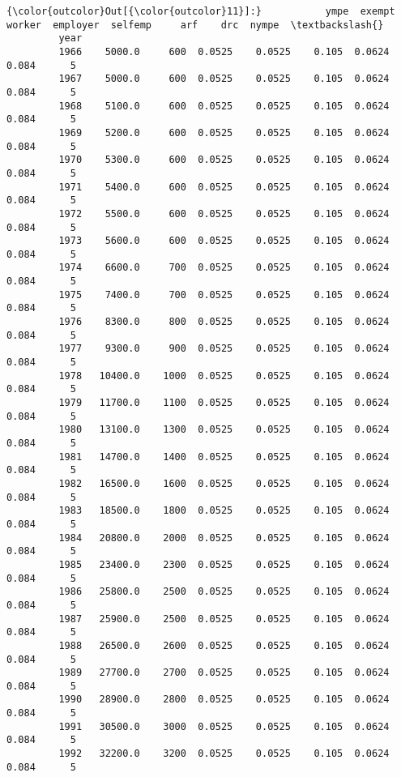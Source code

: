 \documentclass[11pt]{article}
\begin{document}
\begin{Verbatim}[commandchars=\\\{\}]
{\color{outcolor}Out[{\color{outcolor}11}]:}           ympe  exempt  worker  employer  selfemp     arf    drc  nympe  \textbackslash{}
         year                                                                      
         1966    5000.0     600  0.0525    0.0525    0.105  0.0624  0.084      5   
         1967    5000.0     600  0.0525    0.0525    0.105  0.0624  0.084      5   
         1968    5100.0     600  0.0525    0.0525    0.105  0.0624  0.084      5   
         1969    5200.0     600  0.0525    0.0525    0.105  0.0624  0.084      5   
         1970    5300.0     600  0.0525    0.0525    0.105  0.0624  0.084      5   
         1971    5400.0     600  0.0525    0.0525    0.105  0.0624  0.084      5   
         1972    5500.0     600  0.0525    0.0525    0.105  0.0624  0.084      5   
         1973    5600.0     600  0.0525    0.0525    0.105  0.0624  0.084      5   
         1974    6600.0     700  0.0525    0.0525    0.105  0.0624  0.084      5   
         1975    7400.0     700  0.0525    0.0525    0.105  0.0624  0.084      5   
         1976    8300.0     800  0.0525    0.0525    0.105  0.0624  0.084      5   
         1977    9300.0     900  0.0525    0.0525    0.105  0.0624  0.084      5   
         1978   10400.0    1000  0.0525    0.0525    0.105  0.0624  0.084      5   
         1979   11700.0    1100  0.0525    0.0525    0.105  0.0624  0.084      5   
         1980   13100.0    1300  0.0525    0.0525    0.105  0.0624  0.084      5   
         1981   14700.0    1400  0.0525    0.0525    0.105  0.0624  0.084      5   
         1982   16500.0    1600  0.0525    0.0525    0.105  0.0624  0.084      5   
         1983   18500.0    1800  0.0525    0.0525    0.105  0.0624  0.084      5   
         1984   20800.0    2000  0.0525    0.0525    0.105  0.0624  0.084      5   
         1985   23400.0    2300  0.0525    0.0525    0.105  0.0624  0.084      5   
         1986   25800.0    2500  0.0525    0.0525    0.105  0.0624  0.084      5   
         1987   25900.0    2500  0.0525    0.0525    0.105  0.0624  0.084      5   
         1988   26500.0    2600  0.0525    0.0525    0.105  0.0624  0.084      5   
         1989   27700.0    2700  0.0525    0.0525    0.105  0.0624  0.084      5   
         1990   28900.0    2800  0.0525    0.0525    0.105  0.0624  0.084      5   
         1991   30500.0    3000  0.0525    0.0525    0.105  0.0624  0.084      5   
         1992   32200.0    3200  0.0525    0.0525    0.105  0.0624  0.084      5   

\end{Verbatim}
\end{document}
